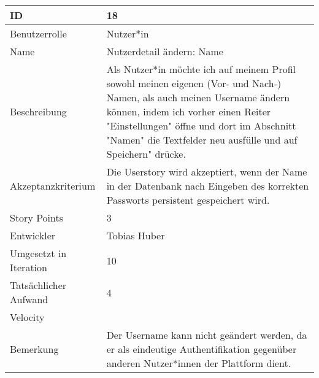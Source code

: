 \begin{tabularx}{\textwidth}{|p{}|X|}
	\hline
	ID & 18\\
	\hline
	Benutzerrolle & Nutzer*in\\
	\hline
	Name & Nutzerdetail ändern: Name\\
	\hline
	Beschreibung & Als Nutzer*in möchte ich auf meinem Profil sowohl meinen eigenen (Vor- und Nach-) Namen, als auch meinen Username ändern können, indem ich vorher einen Reiter "Einstellungen" öffne und dort im Abschnitt "Namen" die Textfelder neu ausfülle und auf Speichern" drücke.\\
	\hline
	Akzeptanzkriterium & Die Userstory wird akzeptiert, wenn der Name in der Datenbank nach Eingeben des korrekten Passworts persistent gespeichert wird.\\
	\hline
	Story Points & 3\\
	\hline
	Entwickler & Tobias Huber\\
	\hline
	Umgesetzt in Iteration & 10\\ 
	\hline
	Tatsächlicher Aufwand & 4\\
	\hline
	Velocity & \\
	\hline
	Bemerkung & Der Username kann nicht geändert werden, da er als eindeutige Authentifikation gegenüber anderen Nutzer*innen der Plattform dient.\\
	\hline
\end{tabularx}
\vspace{20pt}
